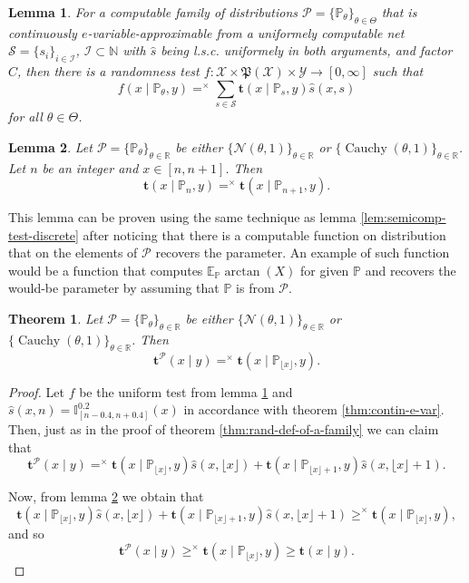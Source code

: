 \documentclass{article}
\newtheorem{lemma}{Lemma}
\newtheorem{theorem}{Theorem}
\theoremstyle{definition}
\theoremstyle{definition}
\newcommand{\natnums}{\mathbb{N}}
\newcommand{\reals}{\mathbb{R}}
\newcommand{\probP}{\mathbb{P}}
\newcommand{\expectE}{\mathbb{E}}
\newcommand{\Cauchy}{\operatorname{Cauchy}}
\newcommand{\uut}{\mathbf{t}}
\begin{document}
\begin{lemma}\label{lem:semicomp-test-contin}
    For a computable family of distributions $\mathcal{P}=\{\probP_\theta\}_{\theta\in\Theta}$ that is continuously $e$-variable-approximable from a uniformely computable net $\mathcal{S}=\{s_i\}_{i\in\mathcal{I}}$, $\mathcal{I}\subset \natnums$ with $\hat{s}$ being l.s.c. uniformely in both arguments, and factor $C$, then there is a randomness test $f: \mathcal{X}\times\mathfrak{P}(\mathcal{X}) \times \mathcal{Y} \to [0,\infty]$ such that 
    \[
        f(x\mid\probP_\theta, y) =^\times \sum_{s\in \mathcal{S}}\uut(x\mid \probP_s, y) \hat s(x, s)
    \]
    for all $\theta\in\Theta$.
\end{lemma}

\begin{lemma}\label{lem:distr-shift}
    Let $\mathcal{P}=\{\probP_\theta\}_{\theta\in\reals}$ be either $\{\mathcal{N}(\theta,1)\}_{\theta\in\reals}$  or $\{ \Cauchy(\theta,1)\}_{\theta\in\reals}$. Let $n$ be an integer and $x \in [n, n+1]$. Then
    \[
        \uut(x \mid \probP_n, y) =^\times \uut(x \mid \probP_{n+1}, y).
    \]
\end{lemma}

This lemma can be proven using the same technique as lemma \ref{lem:semicomp-test-discrete} after noticing that there is a computable function on distribution that on the elements of $\mathcal{P}$ recovers the parameter. An example of such function would be a function that computes $\expectE_\probP \arctan(X)$ for given $\probP$ and recovers the would-be parameter by assuming that $\probP$ is from $\mathcal{P}$.

\begin{theorem}\label{thm:rand-def-norm-cauchy}
    Let $\mathcal{P}=\{\probP_\theta\}_{\theta\in\reals}$ be either $\{\mathcal{N}(\theta,1)\}_{\theta\in\reals}$ or $\{\Cauchy(\theta,1)\}_{\theta\in\reals}$. Then
    \[
        \uut^{\mathcal{P}}(x\mid y) =^\times \uut(x \mid \probP_{\lfloor x\rfloor}, y).
    \]
\end{theorem}

\begin{proof}
    Let $f$ be the uniform test from lemma \ref{lem:semicomp-test-contin} and $\hat s(x, n) = \mathbb{I}^{0.2}_{[n-0.4, n+0.4]}(x)$ in accordance with theorem \ref{thm:contin-e-var}. Then, just as in the proof of theorem \ref{thm:rand-def-of-a-family} we can claim that
    \[
        \uut^{\mathcal{P}}(x\mid y) =^\times \uut(x \mid \probP_{\lfloor x \rfloor}, y) \hat s(x, \lfloor x \rfloor) + \uut(x \mid \probP_{\lfloor x \rfloor +1}, y) \hat s(x, \lfloor x \rfloor +1).
    \]

    Now, from lemma \ref{lem:distr-shift} we obtain that
    \[
        \uut(x \mid \probP_{\lfloor x \rfloor}, y) \hat s(x, \lfloor x \rfloor) + \uut(x \mid \probP_{\lfloor x \rfloor +1}, y) \hat s(x, \lfloor x \rfloor +1) \ge^\times \uut(x \mid \probP_{\lfloor x \rfloor}, y),
    \]
    and so
    \[
        \uut^{\mathcal{P}}(x \mid y) \ge^\times \uut(x \mid \probP_{\lfloor x \rfloor}, y) \ge \uut(x \mid y).
    \]
\end{proof}
\end{document}
